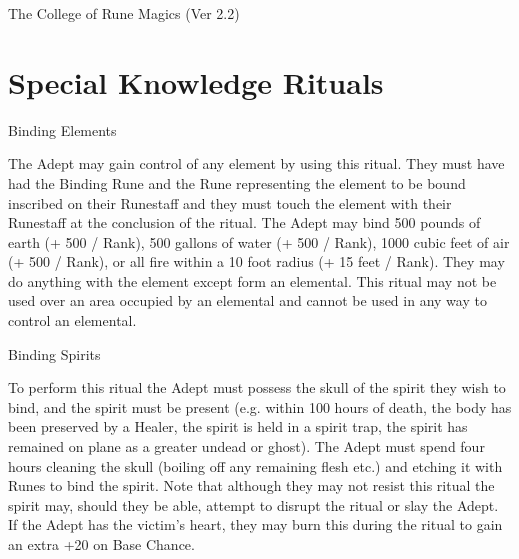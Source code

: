 \begin{Chapter}{The College of Rune Magics (Ver 2.2)}
\section{Special Knowledge Rituals}

\begin{ritual}[R-1]{Binding Elements}

\begin{effects}
The Adept may gain control of any element by using this ritual.  They
must have had the Binding Rune and the Rune representing the element
to be bound inscribed on their Runestaff and they must touch the
element with their Runestaff at the conclusion of the ritual.  The
Adept may bind 500 pounds of earth (+ 500 / Rank), 500 gallons of
water (+ 500 / Rank), 1000 cubic feet of air (+ 500 / Rank), or all
fire within a 10 foot radius (+ 15 feet / Rank).  They may do anything
with the element except form an elemental.  This ritual may not be
used over an area occupied by an elemental and cannot be used in any
way to control an elemental.
\end{effects}
\end{ritual}

\begin{ritual}[R-2]{Binding Spirits}

\begin{effects}
To perform this ritual the Adept must possess the skull of the spirit
they wish to bind, and the spirit must be present (e.g. within 100
hours of death, the body has been preserved by a Healer, the spirit is
held in a spirit trap, the spirit has remained on plane as a greater
undead or ghost). The Adept must spend four hours cleaning the skull
(boiling off any remaining flesh etc.)  and etching it with Runes to
bind the spirit.  Note that although they may not resist this ritual
the spirit may, should they be able, attempt to disrupt the ritual or
slay the Adept.  If the Adept has the victim’s heart, they may burn
this during the ritual to gain an extra +20 on Base Chance.


\end{effects}
\end{ritual}
\end{Chapter}
